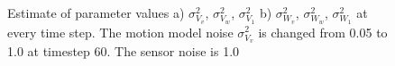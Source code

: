 \documentclass[12pt]{dalcsthesis}
\begin{document}
\begin{figure}[!ht]
  \centering
     \qquad
  \caption{\label{fig-varying_sensor_noise_motion_model_1.0} Estimate of parameter values a) $\sigma_{V_{v}}^{2}$, $\sigma_{V_{w}}^{2}$,  $\sigma_{V_{1}}^{2}$ b)  $\sigma_{W_{v}}^{2}$, $\sigma_{W_{w}}^{2}$, $\sigma_{W_{1}}^{2}$ at every time step. The motion model noise $\sigma_{V_{v}}^{2}$ is changed from 0.05 to 1.0 at timestep 60. The sensor noise is 1.0}
\end{figure}  
\end{document}
